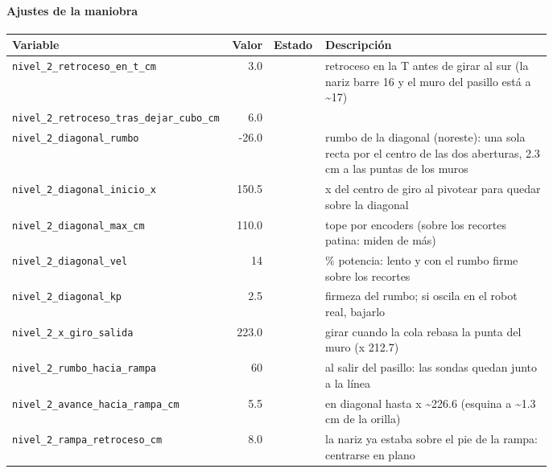 \paragraph{Ajustes de la maniobra}
\begin{longtable}{@{}p{0.36\linewidth}rlp{0.42\linewidth}@{}}\toprule
\textbf{Variable} & \textbf{Valor} & \textbf{Estado} & \textbf{Descripci\'on} \\\midrule\endhead
\texttt{nivel\_\allowbreak{}2\_\allowbreak{}retroceso\_\allowbreak{}en\_\allowbreak{}t\_\allowbreak{}cm} & 3.0 &  & retroceso en la T antes de girar al sur (la nariz barre 16 y el muro del pasillo está a \textasciitilde{}17) \\
\texttt{nivel\_\allowbreak{}2\_\allowbreak{}retroceso\_\allowbreak{}tras\_\allowbreak{}dejar\_\allowbreak{}cubo\_\allowbreak{}cm} & 6.0 &  &  \\
\texttt{nivel\_\allowbreak{}2\_\allowbreak{}diagonal\_\allowbreak{}rumbo} & -26.0 &  & rumbo de la diagonal (noreste): una sola recta por el centro de las dos aberturas, 2.3 cm a las puntas de los muros \\
\texttt{nivel\_\allowbreak{}2\_\allowbreak{}diagonal\_\allowbreak{}inicio\_\allowbreak{}x} & 150.5 &  & x del centro de giro al pivotear para quedar sobre la diagonal \\
\texttt{nivel\_\allowbreak{}2\_\allowbreak{}diagonal\_\allowbreak{}max\_\allowbreak{}cm} & 110.0 &  & tope por encoders (sobre los recortes patina: miden de más) \\
\texttt{nivel\_\allowbreak{}2\_\allowbreak{}diagonal\_\allowbreak{}vel} & 14 &  & \% potencia: lento y con el rumbo firme sobre los recortes \\
\texttt{nivel\_\allowbreak{}2\_\allowbreak{}diagonal\_\allowbreak{}kp} & 2.5 &  & firmeza del rumbo; si oscila en el robot real, bajarlo \\
\texttt{nivel\_\allowbreak{}2\_\allowbreak{}x\_\allowbreak{}giro\_\allowbreak{}salida} & 223.0 &  & girar cuando la cola rebasa la punta del muro (x 212.7) \\
\texttt{nivel\_\allowbreak{}2\_\allowbreak{}rumbo\_\allowbreak{}hacia\_\allowbreak{}rampa} & 60 &  & al salir del pasillo: las sondas quedan junto a la línea \\
\texttt{nivel\_\allowbreak{}2\_\allowbreak{}avance\_\allowbreak{}hacia\_\allowbreak{}rampa\_\allowbreak{}cm} & 5.5 &  & en diagonal hasta x \textasciitilde{}226.6 (esquina a \textasciitilde{}1.3 cm de la orilla) \\
\texttt{nivel\_\allowbreak{}2\_\allowbreak{}rampa\_\allowbreak{}retroceso\_\allowbreak{}cm} & 8.0 &  & la nariz ya estaba sobre el pie de la rampa: centrarse en plano \\
\bottomrule\end{longtable}
